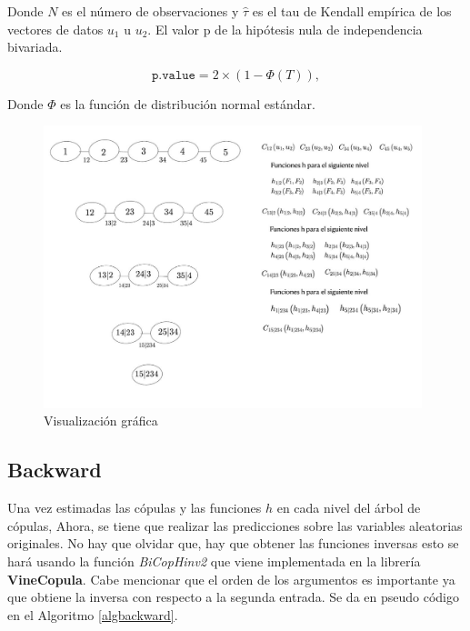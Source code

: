 Donde $N$ es el número de observaciones y $\hat{\tau}$ es el tau de Kendall empírica de los vectores de datos $u_1$ u $u_2$. El valor p de la hipótesis nula de independencia bivariada.

\begin{equation}
    \texttt{p.value} = 2 \times \left(1 - \Phi\left(T\right)\right),
\end{equation}


Donde $\Phi$ es la función de distribución normal estándar.

\begin{figure}[H]
    \centering
    \includegraphics[width = 0.98\textwidth]{Imagenes/Construccion.jpeg}
    \caption{Visualización gráfica}
    \label{fig:construccion}
\end{figure}


\subsection{Backward}

Una vez estimadas las cópulas y las funciones $h$  en cada nivel del árbol de cópulas, Ahora, se tiene que realizar las predicciones sobre las variables aleatorias originales. No hay que olvidar que, hay que obtener las funciones inversas esto se hará usando la función \textit{BiCopHinv2} que viene implementada en la librería \textbf{VineCopula}. Cabe mencionar que el orden de los argumentos es importante ya que obtiene la inversa con respecto a la segunda entrada. Se da en pseudo código en el Algoritmo \ref{algbackward}.


